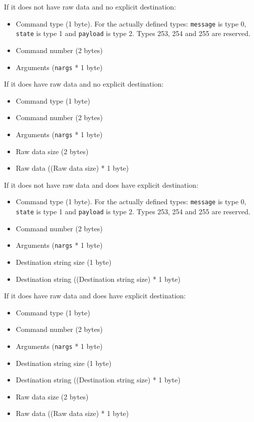 \documentclass[12pt,a4paper]{report}
\begin{document}
If it does not have raw data and no explicit destination:
\begin{itemize}
\item Command type (1 byte). For the actually defined types: \texttt{message} is type 0, \texttt{state} is type 1 and \texttt{payload} is type 2. Types 253, 254 and 255 are reserved.
\item Command number (2 bytes)
\item Arguments (\texttt{nargs} * 1 byte)
\end{itemize}

If it does have raw data and no explicit destination:
\begin{itemize}
\item Command type (1 byte)
\item Command number (2 bytes)
\item Arguments (\texttt{nargs} * 1 byte)
\item Raw data size (2 bytes)
\item Raw data ((Raw data size) * 1 byte)
\end{itemize}

If it does not have raw data and does have explicit destination:
\begin{itemize}
\item Command type (1 byte). For the actually defined types: \texttt{message} is type 0, \texttt{state} is type 1 and \texttt{payload} is type 2. Types 253, 254 and 255 are reserved.
\item Command number (2 bytes)
\item Arguments (\texttt{nargs} * 1 byte)
\item Destination string size (1 byte)
\item Destination string ((Destination string size) * 1 byte)
\end{itemize}

If it does have raw data and does have explicit destination:
\begin{itemize}
\item Command type (1 byte)
\item Command number (2 bytes)
\item Arguments (\texttt{nargs} * 1 byte)
\item Destination string size (1 byte)
\item Destination string ((Destination string size) * 1 byte)
\item Raw data size (2 bytes)
\item Raw data ((Raw data size) * 1 byte)
\end{itemize}
\end{document}
